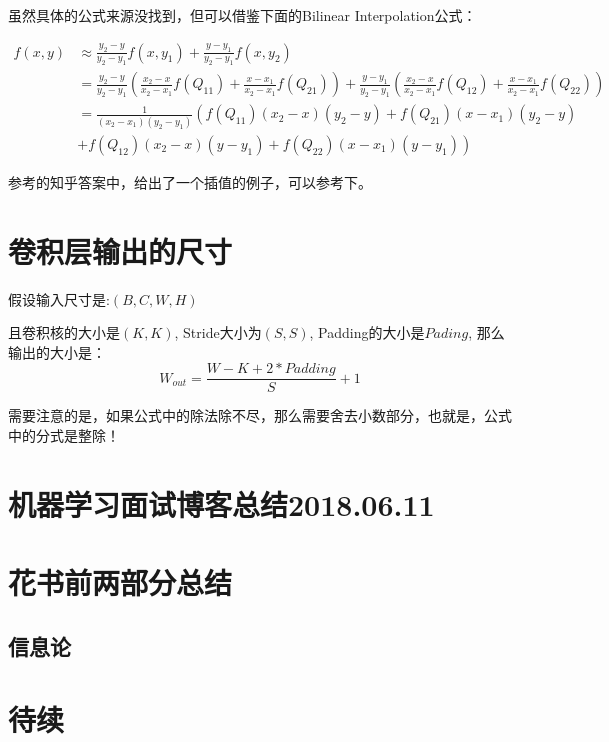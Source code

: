 虽然具体的公式来源没找到，但可以借鉴下面的Bilinear Interpolation公式：

\begin{align*}
f(x, y)  & \approx \frac{y_2 - y}{y_2 - y_1} f(x, y_1) + \frac{y-y_1}{y_2 - y_1}f(x, y_2) \\
 & =  \frac{y_2 - y}{y_2 - y_1} \left( \frac{x_2 - x}{x_2 - x_1} f(Q_{11}) + \frac{x - x_1}{x_2 - x_1} f(Q_{21}) \right) + \frac{y - y_1}{y_2 - y_1} \left( \frac{x_2 - x}{x_2 - x_1} f(Q_{12}) + \frac{x - x_1}{x_2 - x_1} f(Q_{22}) \right) \\
 & = \frac{1}{(x_2 - x_1)(y_2 - y_1)} \left( f(Q_{11})(x_2 - x)(y_2 - y) + f(Q_{21})(x - x_1)(y_2 - y) \right.\\
 & + \left. f(Q_{12})(x_2 - x)(y - y_1) + f(Q_{22})(x - x_1)(y - y_1) \right)
\end{align*}

参考的知乎答案中，给出了一个插值的例子，可以参考下。

\section{卷积层输出的尺寸}

假设输入尺寸是:$(B, C, W, H)$

且卷积核的大小是$(K, K)$, Stride大小为$(S, S)$, Padding的大小是$Pading$, 那么输出的大小是：
\begin{displaymath}
W_{out} = \frac{W - K + 2 * Padding}{S} + 1
\end{displaymath}

需要注意的是，如果公式中的除法除不尽，那么需要舍去小数部分，也就是，公式中的分式是整除！

\section{机器学习面试博客总结2018.06.11}


\section{花书前两部分总结}

\subsection{信息论}









\section{待续}













